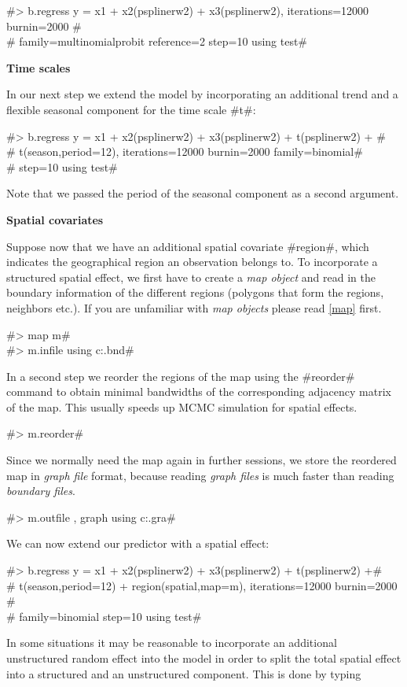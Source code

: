 #> b.regress y = x1 + x2(psplinerw2) + x3(psplinerw2), iterations=12000 burnin=2000 #\\
#  family=multinomialprobit reference=2 step=10 using test#


{\bf Time scales}
\medskip

In our next step we extend the model by incorporating an
additional trend and a flexible seasonal component for the time
scale #t#:

#> b.regress y = x1 + x2(psplinerw2) + x3(psplinerw2) + t(psplinerw2) + #\\
#  t(season,period=12), iterations=12000 burnin=2000 family=binomial#\\
#  step=10 using test#

Note that we passed the period of the seasonal component as a
second argument.

{\bf Spatial covariates}
\medskip

Suppose now that we have an additional spatial covariate #region#,
which indicates the geographical region an observation belongs to.
To incorporate a structured spatial effect, we first have to
create a {\em map object} and read in the boundary information of
the different regions (polygons that form the regions, neighbors
etc.). If you are unfamiliar with {\em map objects} please read
\autoref{map} first.

#> map m# \\
#> m.infile using c:\maps\map.bnd#

In a second step we reorder the regions of the map using the
#reorder# command to obtain minimal bandwidths of the
corresponding adjacency matrix of the map. This usually speeds up
MCMC simulation for spatial effects.

#> m.reorder#

Since we normally need the map again in further sessions, we store
the reordered map in {\em graph file} format, because reading {\em
graph files} is much faster than reading {\em boundary files}.

#> m.outfile , graph using c:\maps\mapgraph.gra#

We can now extend our predictor with a spatial effect:

#> b.regress y = x1 + x2(psplinerw2) + x3(psplinerw2) + t(psplinerw2) +# \\
#  t(season,period=12) + region(spatial,map=m), iterations=12000 burnin=2000 #\\
#  family=binomial step=10 using test#

In some situations it may be reasonable to incorporate  an
additional unstructured  random effect into the model in order to
split the total spatial effect into a structured and an
unstructured component. This is done by typing

